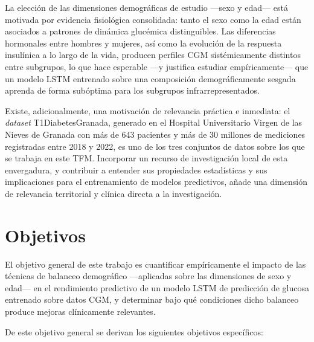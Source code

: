 La elección de las dimensiones demográficas de estudio ---sexo y edad--- está motivada
por evidencia fisiológica consolidada: tanto el sexo como la edad están asociados a
patrones de dinámica glucémica distinguibles. Las diferencias hormonales entre hombres
y mujeres, así como la evolución de la respuesta insulínica a lo largo de la vida,
producen perfiles CGM sistémicamente distintos entre subgrupos, lo que hace
esperable ---y justifica estudiar empíricamente--- que un modelo LSTM entrenado sobre
una composición demográficamente sesgada aprenda de forma subóptima para los subgrupos
infrarrepresentados.

Existe, adicionalmente, una motivación de relevancia práctica e inmediata: el
\emph{dataset} T1DiabetesGranada, generado en el Hospital Universitario Virgen de las
Nieves de Granada con más de 643 pacientes y más de 30 millones de mediciones
registradas entre 2018 y 2022, es uno de los tres conjuntos de datos sobre los que se
trabaja en este TFM. Incorporar un recurso de investigación local de esta envergadura,
y contribuir a entender sus propiedades estadísticas y sus implicaciones para el
entrenamiento de modelos predictivos, añade una dimensión de relevancia territorial y
clínica directa a la investigación.


\section{Objetivos}
\label{section:objetivos}

El objetivo general de este trabajo es cuantificar empíricamente el impacto de las técnicas de balanceo demográfico —aplicadas sobre las dimensiones de sexo y edad— en el rendimiento predictivo de un modelo LSTM de predicción de glucosa entrenado sobre datos CGM, y determinar bajo qué condiciones dicho balanceo produce mejoras clínicamente relevantes.

De este objetivo general se derivan los siguientes objetivos específicos:

